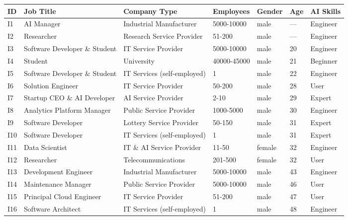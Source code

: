\begin{tabular}{lllllll}
    ID & Job Title & Company Type & Employees & Gender & Age & AI Skills \\
    \toprule
    I1 & AI Manager & Industrial Manufacturer & 5000-10000 & male & --- & Engineer \\
    I2 & Researcher & Research Service Provider & 51-200 & male & --- & Engineer \\
    I3 & Software Developer \& Student & IT Service Provider & 5000-10000 & male & 20 & Engineer \\
    I4 & Student & University & 40000-45000 & male & 21 & Beginner \\
    I5 & Software Developer \& Student & IT Services (self-employed) & 1 & male & 22 & Engineer \\
    I6 & Solution Engineer & IT Service Provider & 50-200 & male & 28 & User \\
    I7 & Startup CEO \& AI Developer & AI Service Provider & 2-10 & male & 29 & Expert \\
    I8 & Analytics Platform Manager & Public Service Provider & 1000-5000 & male & 30 & Engineer \\
    I9 & Software Developer & Lottery Service Provider & 50-150 & male & 31 & Expert \\
    I10 & Software Developer & IT Services (self-employed) & 1 & male & 31 & Expert \\
    I11 & Data Scientist & IT \& AI Service Provider & 11-50 & female & 32 & Engineer \\
    I12 & Researcher  & Telecommunications & 201-500 & female & 32 & User \\
    I13 & Development Engineer & Industrial Manufacturer & 5000-10000 & male & 43 & Engineer \\
    I14 & Maintenance Manager  & Public Service Provider & 5000-10000 & male & 46 & User \\
    I15 & Principal Cloud Engineer & IT Service Provider & 51-200 & male & 47 & User \\
    I16 & Software Architect & IT Services (self-employed) & 1 & male & 48 & Engineer \\
\end{tabular}